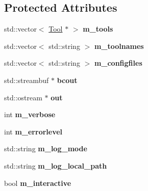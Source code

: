 \subsection*{Protected Attributes}
\begin{DoxyCompactItemize}
\item 
\hypertarget{classToolChain_a78a1e722f03588a9783b8ca5f178e81b}{std\-::vector$<$ \hyperlink{classTool}{Tool} $\ast$ $>$ {\bfseries m\-\_\-tools}}\label{classToolChain_a78a1e722f03588a9783b8ca5f178e81b}

\item 
\hypertarget{classToolChain_a8479eba49e3fcb38c6679a5dbd5581e2}{std\-::vector$<$ std\-::string $>$ {\bfseries m\-\_\-toolnames}}\label{classToolChain_a8479eba49e3fcb38c6679a5dbd5581e2}

\item 
\hypertarget{classToolChain_aa2cdf72577745496f463ca154bb9950a}{std\-::vector$<$ std\-::string $>$ {\bfseries m\-\_\-configfiles}}\label{classToolChain_aa2cdf72577745496f463ca154bb9950a}

\item 
\hypertarget{classToolChain_ad1dc1ae556666fe54faafef2f0c338cf}{std\-::streambuf $\ast$ {\bfseries bcout}}\label{classToolChain_ad1dc1ae556666fe54faafef2f0c338cf}

\item 
\hypertarget{classToolChain_acf52c79675be51308ee5743d5e5a94cf}{std\-::ostream $\ast$ {\bfseries out}}\label{classToolChain_acf52c79675be51308ee5743d5e5a94cf}

\item 
\hypertarget{classToolChain_a3e157c7148cbdb9eccd43fce185297f5}{int {\bfseries m\-\_\-verbose}}\label{classToolChain_a3e157c7148cbdb9eccd43fce185297f5}

\item 
\hypertarget{classToolChain_a26843fabb52f0fba5f91be3da7564e4e}{int {\bfseries m\-\_\-errorlevel}}\label{classToolChain_a26843fabb52f0fba5f91be3da7564e4e}

\item 
\hypertarget{classToolChain_aa36a20b14abe2e1f491396f396bf41c3}{std\-::string {\bfseries m\-\_\-log\-\_\-mode}}\label{classToolChain_aa36a20b14abe2e1f491396f396bf41c3}

\item 
\hypertarget{classToolChain_a030b1214102cfb02242e2247248f6087}{std\-::string {\bfseries m\-\_\-log\-\_\-local\-\_\-path}}\label{classToolChain_a030b1214102cfb02242e2247248f6087}

\item 
\hypertarget{classToolChain_a1ed4e371b26c220f0018ad54dc2260fd}{bool {\bfseries m\-\_\-interactive}}\label{classToolChain_a1ed4e371b26c220f0018ad54dc2260fd}


\end{DoxyCompactItemize}
